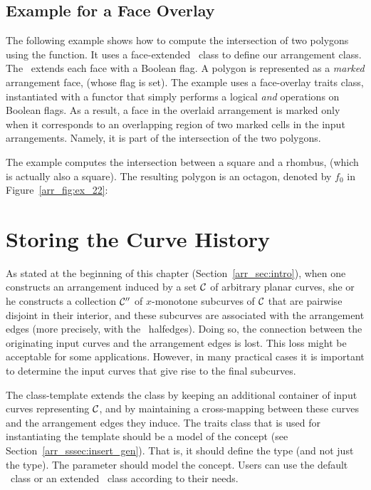 
\subsection{Example for a Face Overlay}
\label{arr_ssec:face_ovl}
%
The following example shows how to compute the intersection of two polygons
using the  function. It uses a face-extended \dcel\ class
to define our arrangement class. The \dcel\ extends each face with a Boolean 
flag. A polygon is represented as a {\sl marked} arrangement face, (whose
flag is set). The example uses a face-overlay traits class, instantiated with 
a functor that simply performs a logical {\em and} operations on Boolean flags.
As a result, a face in the overlaid arrangement is marked only when it
corresponds to an overlapping region of two marked cells in the input
arrangements. Namely, it is part of the intersection of the two polygons.

The example computes the intersection between a square and a rhombus, (which is
actually also a square). The resulting polygon is an octagon, denoted
by $f_0$ in Figure~\ref{arr_fig:ex_22}:


\section{Storing the Curve History}
\label{arr_sec:arr_with_hist}
%
As stated at the beginning of this chapter (Section~\ref{arr_sec:intro}), 
when one constructs an arrangement induced by a set ${\cal C}$ of arbitrary 
planar curves, she or he constructs a collection ${\cal C}''$ of $x$-monotone 
subcurves of ${\cal C}$ that are pairwise disjoint in their interior, and these 
subcurves are associated with the arrangement edges (more precisely, with the 
\dcel\ halfedges). Doing so, the connection between the originating input 
curves and the arrangement edges is lost. This loss might be acceptable for 
some applications. However, in many practical cases it is important to 
determine the input curves that give rise to the final subcurves.

The  class-template extends
the  class by keeping an additional container of input
curves representing ${\cal C}$, and by maintaining a cross-mapping between these
curves and the arrangement edges they induce. The traits class that is
used for instantiating the template should be a model of the
 concept (see Section~\ref{arr_sssec:insert_gen}).
That is, it should define the  type (and not just the
 type). The  parameter should model the 
 concept. Users can use the default \dcel\ class or 
an extended \dcel\ class according to their needs.

